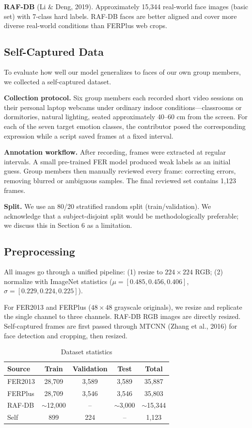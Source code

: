 \documentclass[12pt,a4paper]{article}
\begin{document}
\textbf{RAF-DB} (Li \& Deng, 2019). Approximately 15,344 real-world face images (basic set) with 7-class hard labels. RAF-DB faces are better aligned and cover more diverse real-world conditions than FERPlus web crops.

\subsection{Self-Captured Data}

To evaluate how well our model generalizes to faces of our own group members, we collected a self-captured dataset.

\textbf{Collection protocol.} Six group members each recorded short video sessions on their personal laptop webcams under ordinary indoor conditions---classrooms or dormitories, natural lighting, seated approximately 40--60 cm from the screen. For each of the seven target emotion classes, the contributor posed the corresponding expression while a script saved frames at a fixed interval.

\textbf{Annotation workflow.} After recording, frames were extracted at regular intervals. A small pre-trained FER model produced weak labels as an initial guess. Group members then manually reviewed every frame: correcting errors, removing blurred or ambiguous samples. The final reviewed set contains 1,123 frames.

\textbf{Split.} We use an 80/20 stratified random split (train/validation). We acknowledge that a subject-disjoint split would be methodologically preferable; we discuss this in Section 6 as a limitation.

\subsection{Preprocessing}

All images go through a unified pipeline: (1) resize to $224\times224$ RGB; (2) normalize with ImageNet statistics ($\mu=[0.485, 0.456, 0.406]$, $\sigma=[0.229, 0.224, 0.225]$).

For FER2013 and FERPlus ($48\times48$ grayscale originals), we resize and replicate the single channel to three channels. RAF-DB RGB images are directly resized. Self-captured frames are first passed through MTCNN (Zhang et al., 2016) for face detection and cropping, then resized.

\begin{table}[H]
\centering
\caption{Dataset statistics}
\begin{tabular}{lcccc}
\toprule
Source & Train & Validation & Test & Total \\
\midrule
FER2013 & 28,709 & 3,589 & 3,589 & 35,887 \\
FERPlus & 28,709 & 3,546 & 3,546 & 35,803 \\
RAF-DB  & $\sim$12,000 & -- & $\sim$3,000 & $\sim$15,344 \\
Self    & 899 & 224 & -- & 1,123 \\
\bottomrule
\end{tabular}
\end{table}
\end{document}
